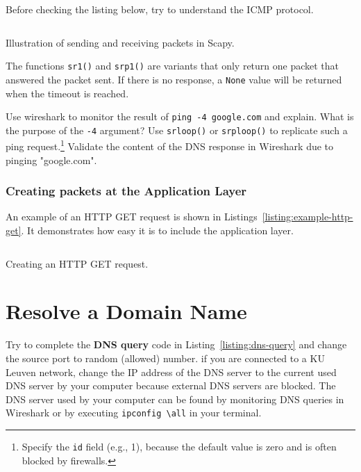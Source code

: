 \documentclass[11pt,a4paper]{article}
\begin{document}
 \begin{info}
     Before checking the listing below, try to understand the ICMP protocol.
 \end{info}

\begin{listing}[h]
\inputminted{python}{../code_students/example_sr.py}
\caption{Illustration of sending and receiving packets in Scapy.}%
\label{listing:example-sr}
\end{listing}

 The functions \texttt{sr1()}  and \texttt{srp1()} are variants that only return one packet that answered the packet sent. If there is no response, a \texttt{None} value will be returned when the timeout is reached. 
 
 \begin{question}
     Use wireshark to monitor the result of \texttt{ping -4 google.com} and explain. What is the purpose of the \texttt{-4} argument? 
     Use \texttt{srloop()} or \texttt{srploop()} to replicate such a ping request.\footnote{Specify the \texttt{id} field (e.g., 1), because the default value is zero and is often blocked by firewalls. } Validate the content of the DNS response in Wireshark due to pinging "google.com".
 \end{question}
 
\subsubsection{Creating packets at the Application Layer}
An example of an HTTP GET request is shown in Listings~\ref{listing:example-http-get}. It demonstrates how easy it is to include the application layer. 

\begin{listing}[h]
\inputminted{python}{../code_students/example-http-get.py}
\caption{Creating an HTTP GET request.}%
\label{listing:example-http-get}
\end{listing}



\FloatBarrier
\section{Resolve a Domain Name}
Try to complete the \textbf{DNS query} code in Listing~\ref{listing:dns-query} and change the source port to random (allowed) number.
if you are connected to a KU Leuven network, change the IP address of the DNS server to the current used DNS server by your computer because external DNS servers are blocked. The DNS server used by your computer can be found by monitoring DNS queries in Wireshark or by executing \texttt{ipconfig \textbackslash all} in your terminal.
\end{document}
